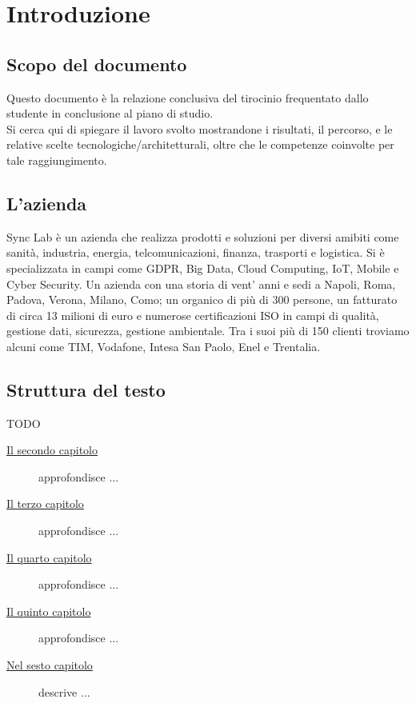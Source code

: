 
\chapter{Introduzione}
\label{cap:introduzione}

\section{Scopo del documento}

Questo documento è la relazione conclusiva del tirocinio frequentato dallo
studente in conclusione al piano di studio. \\
Si cerca qui di spiegare il lavoro svolto mostrandone i risultati, il percorso, 
e le relative scelte tecnologiche/architetturali, oltre che le competenze
coinvolte per tale raggiungimento.

\section{L'azienda}
Sync Lab è un azienda che realizza prodotti e soluzioni per diversi amibiti come
sanità, industria, energia, telcomunicazioni, finanza, trasporti e logistica.
Si è specializzata in campi come GDPR, Big Data, Cloud Computing, IoT, Mobile e Cyber Security.
Un azienda con una storia di vent' anni e sedi a Napoli, Roma, Padova, Verona, Milano, Como;
un organico di più di 300 persone, un fatturato di circa 13 milioni di euro e numerose certificazioni
ISO in campi di qualità, gestione dati, sicurezza, gestione ambientale.
Tra i suoi più di 150 clienti troviamo alcuni come TIM, Vodafone, Intesa San Paolo, Enel e Trentalia.

\section{Struttura del testo}

{\Huge TODO}
\begin{description}
    \item[{\hyperref[cap:descrizione-stage]{Il secondo capitolo}}] approfondisce ...
    
    \item[{\hyperref[cap:analisi-requisiti]{Il terzo capitolo}}] approfondisce ...
    
    \item[{\hyperref[cap:progettazione-codifica]{Il quarto capitolo}}] approfondisce ...
    
    \item[{\hyperref[cap:verifica-validazione]{Il quinto capitolo}}] approfondisce ...
    
    \item[{\hyperref[cap:conclusioni]{Nel sesto capitolo}}] descrive ...
\end{description}

